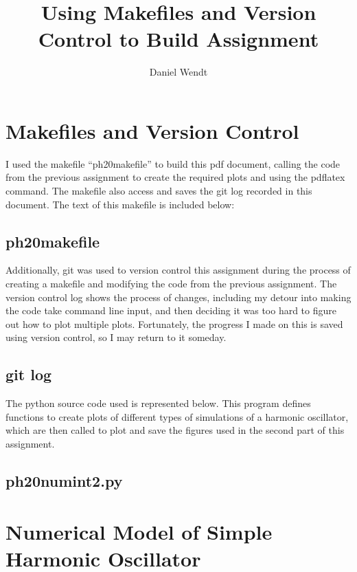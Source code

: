 \documentclass{article}
\title{Using Makefiles and Version Control to Build Assignment}
\author{Daniel Wendt}
\begin{document}
\maketitle

\section{Makefiles and Version Control}

I used the makefile ``ph20makefile'' to build this pdf document, calling the code from the previous assignment to create the required plots and using the pdflatex command. The makefile also access and saves the git log recorded in this document. The text of this makefile is included below:

\subsection*{ph20makefile}
\texttt{}

Additionally, git was used to version control this assignment during the process of creating a makefile and modifying the code from the previous assignment. The version control log shows the process of changes, including my detour into making the code take command line input, and then deciding it was too hard to figure out how to plot multiple plots. Fortunately, the progress I made on this is saved using version control, so I may return to it someday. 

\pagebreak

\subsection*{git log}
\texttt{}

The python source code used is represented below. This program defines functions to create plots of different types of simulations of a harmonic oscillator, which are then called to plot and save the figures used in the second part of this assignment.

\subsection*{ph20numint2.py}
\texttt{}

\section{Numerical Model of Simple Harmonic Oscillator}
\end{document}
